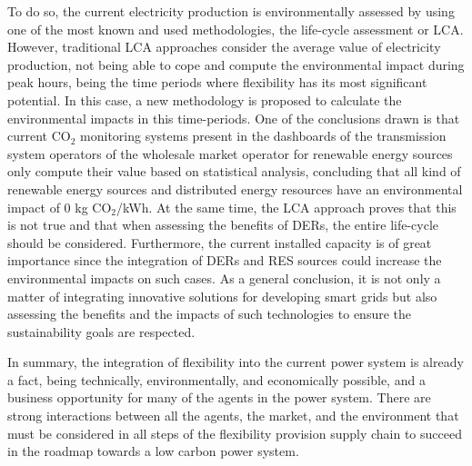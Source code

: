  To do so, the current electricity production is environmentally assessed by using one of the most known and used methodologies, the life-cycle assessment or LCA. However, traditional LCA approaches consider the average value of electricity production, not being able to cope and compute the environmental impact during peak hours, being the time periods where flexibility has its most significant potential. In this case, a new methodology is proposed to calculate the environmental impacts in this time-periods. One of the conclusions drawn is that current CO$_2$ monitoring systems present in the dashboards of the transmission system operators of the wholesale market operator for renewable energy sources only compute their value based on statistical analysis, concluding that all kind of renewable energy sources and distributed energy resources have an environmental impact of 0 kg CO$_2$/kWh. At the same time, the LCA approach proves that this is not true and that when assessing the benefits of DERs, the entire life-cycle should be considered. Furthermore, the current installed capacity is of great importance since the integration of DERs and RES sources could increase the environmental impacts on such cases. As a general conclusion, it is not only a matter of integrating innovative solutions for developing smart grids but also assessing the benefits and the impacts of such technologies to ensure the sustainability goals are respected. 

In summary, the integration of flexibility into the current power system is already a fact, being technically, environmentally, and economically possible, and a business opportunity for many of the agents in the power system. There are strong interactions between all the agents, the market, and the environment that must be considered in all steps of the flexibility provision supply chain to succeed in the roadmap towards a low carbon power system. 
     
